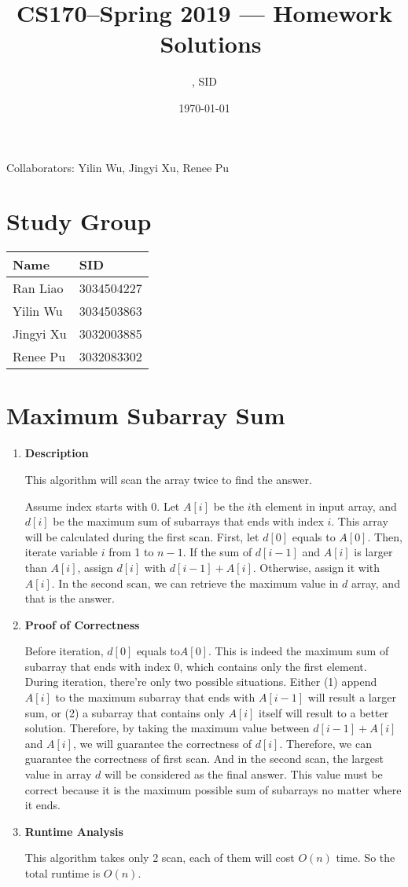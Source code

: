 \documentclass[11pt]{article}
\title{CS170--Spring 2019 --- Homework \Homework\ Solutions}
\author{\Name, SID \SID}
\date{\today}
\newenvironment{qparts}{\begin{enumerate}[{(}a{)}]}{\end{enumerate}}
\begin{document}
\maketitle
Collaborators: Yilin Wu, Jingyi Xu, Renee Pu

\section{Study Group}
\begin{tabular}{ll}
    Name        &   SID         \\\hline
    Ran Liao    &   3034504227  \\  
    Yilin Wu    &   3034503863  \\
    Jingyi Xu   &   3032003885  \\
    Renee Pu    &   3032083302  \\
\end{tabular}



\newpage
\section{Maximum Subarray Sum}

\begin{qparts}
	\item \textbf{Description}

	This algorithm will scan the array twice to find the answer.
		
	Assume index starts with 0. Let $A[i]$ be the $i$th element in input array, and $d[i]$ be the maximum sum of subarrays that ends with index $i$. This array will be calculated during the first scan. First, let $d[0]$ equals to $A[0]$. Then, iterate variable $i$ from 1 to $n-1$. If the sum of $d[i-1]$ and $A[i]$ is larger than $A[i]$, assign $d[i]$ with $d[i-1] + A[i]$. Otherwise, assign it with $A[i]$. In the second scan, we can retrieve the maximum value in $d$ array, and that is the answer.
	
	\item \textbf{Proof of Correctness}
	
	Before iteration, $d[0]$ equals to$A[0]$. This is indeed the maximum sum of subarray that ends with index 0, which contains only the first element. During iteration, there're only two possible situations. Either (1) append $A[i]$ to the maximum subarray that ends with $A[i-1]$ will result a larger sum, or (2) a subarray that contains only $A[i]$ itself will result to a better solution. Therefore, by taking the maximum value between $d[i-1] + A[i]$ and $A[i]$, we will guarantee the correctness of $d[i]$. Therefore, we can guarantee the correctness of first scan. And in the second scan, the largest value in array $d$ will be considered as the final answer. This value must be correct because it is the maximum possible sum of subarrays no matter where it ends.
	
	\item \textbf{Runtime Analysis}
	
	This algorithm takes only 2 scan, each of them will cost $O(n)$ time. So the total runtime is $O(n)$.

\end{qparts}
\end{document}
